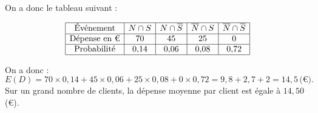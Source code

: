 On a donc le tableau suivant :

\[
\begin{array}{|c|c|c|c|c|}
\hline
\text{Événement} & N \cap S & N \cap \overline{S} & \overline{N} \cap S & \overline{N} \cap \overline{S} \\
\hline
\text{Dépense en €} & 70 & 45 & 25 & 0 \\
\hline
\text{Probabilité} & 0{,}14 & 0{,}06 & 0{,}08 & 0{,}72 \\
\hline
\end{array}
\]

On a donc :
\[
E(D) = 70 \times 0{,}14 + 45 \times 0{,}06 + 25 \times 0{,}08 + 0 \times 0{,}72 = 9{,}8 + 2{,}7 + 2 = 14{,}5 \, \text{(€)}.
\]
Sur un grand nombre de clients, la dépense moyenne par client est égale à \(14{,}50\) (€).
